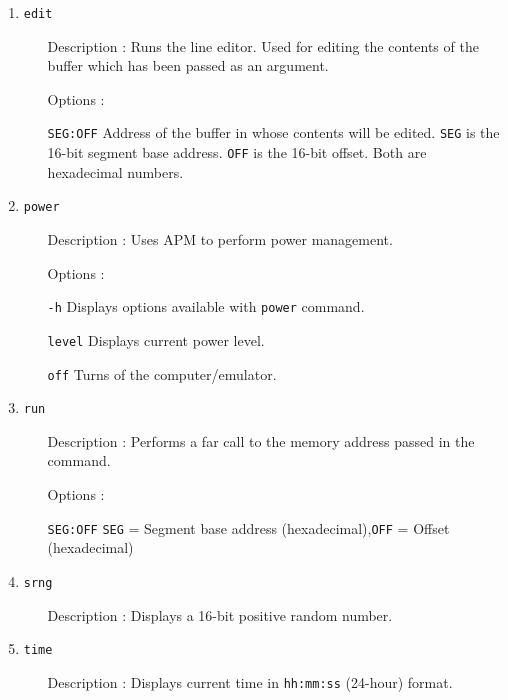 \begin{enumerate}
\begin{enumerate}[align=parleft, labelsep=2cm, leftmargin=1.06in]
  		\end{enumerate}
  \item \texttt{edit}
  		\begin{enumerate}[align=parleft, labelsep=2cm, leftmargin=1.06in]
  		  \item[Description]: Runs the line editor. Used for editing the contents of the buffer which has been passed as an argument.
  		  \item[Options]:
  		  \item[\texttt{SEG:OFF}] Address of the buffer in whose contents will be edited. \texttt{SEG} is the 16-bit segment base address. \texttt{OFF} is the 16-bit offset. Both are hexadecimal numbers.  
  		\end{enumerate}
  \item \texttt{power}
  		\begin{enumerate}[align=parleft, labelsep=2cm, leftmargin=1.06in]
  		  \item[Description]: Uses APM to perform power management.
  		  \item[Options]:
  		  \item[\texttt{-h}] Displays options available with \texttt{power} command.
  		  \item[\texttt{level}] Displays current power level.
  		  \item[\texttt{off}] Turns of the computer/emulator.
  		\end{enumerate}
  \item \texttt{run}
  		\begin{enumerate}[align=parleft, labelsep=2cm, leftmargin=1.06in]
  		  \item[Description]: Performs a far call to the memory address passed in the command.
  		  \item[Options]:
  		  \item[\texttt{SEG:OFF}]\texttt{SEG} = Segment base address (hexadecimal),\newline\texttt{OFF} = Offset (hexadecimal)
  		\end{enumerate}
  \item \texttt{srng}
  		\begin{enumerate}[align=parleft, labelsep=2cm, leftmargin=1.06in]
  		  \item[Description]: Displays a 16-bit positive random number.
  		\end{enumerate}
  \item \texttt{time}
  		\begin{enumerate}[align=parleft, labelsep=2cm, leftmargin=1.06in]
  		  \item[Description]: Displays current time in \texttt{hh:mm:ss} (24-hour) format.
  		\end{enumerate}
\end{enumerate}


